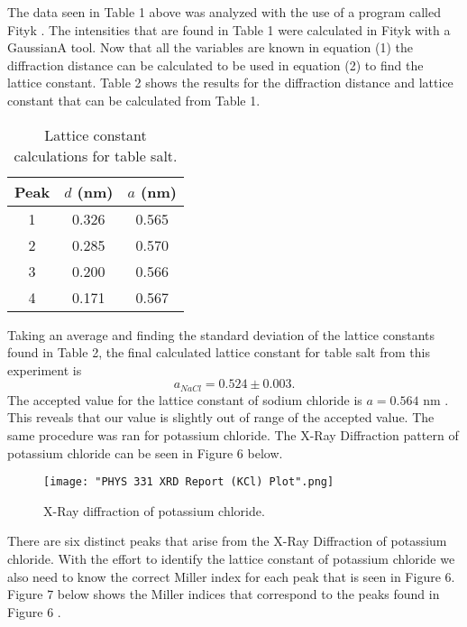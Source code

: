 \documentclass[twocolumn]{article}
\begin{document}
\newline
The data seen in Table 1 above was analyzed with the use of a program called Fityk \cite{Fityk}. The intensities that are found in Table 1 were calculated in Fityk with a GaussianA tool. Now that all the variables are known in equation (1) the diffraction distance can be calculated to be used in equation (2) to find the lattice constant. Table 2 shows the results for the diffraction distance and lattice constant that can be calculated from Table 1.
\begin{table}[htp]
\begin{center}
\begin{tabular}{|c|c|c|}
	\hline \small\textbf{{Peak}} &\small{\textbf{$d$ (nm)}} & \small{\textbf{$a$ (nm)}} \\ \hline
	1 & 0.326 & 0.565 \\ \hline
	2 & 0.285 & 0.570 \\ \hline
	3 & 0.200 & 0.566 \\ \hline
	4 & 0.171 & 0.567 \\ \hline
\end{tabular}
\caption{Lattice constant calculations for table salt.}
\end{center}
\label{default}
\end{table}%
\newline
Taking an average and finding the standard deviation of the lattice constants found in Table 2, the final calculated lattice constant for table salt from this experiment is
\begin{equation}
a_{NaCl}=0.524\pm0.003.
\end{equation}
The accepted value for the lattice constant of sodium chloride is $a=0.564$ nm \cite{WikiLattice}. This reveals that our value is slightly out of range of the accepted value. The same procedure was ran for potassium chloride. The X-Ray Diffraction pattern of potassium chloride can be seen in Figure 6 below.
\begin{figure}[htbp]
\begin{center}
\texttt{[image: "PHYS 331 XRD Report (KCl) Plot".png]}
\caption{X-Ray diffraction of potassium chloride.}
\label{default}
\end{center}
\end{figure}
\newline
There are six distinct peaks that arise from the X-Ray Diffraction of potassium chloride. With the effort to identify the lattice constant of potassium chloride we also need to know the correct Miller index for each peak that is seen in Figure 6. Figure 7 below shows the Miller indices that correspond to the peaks found in Figure 6 \cite{Lin}.
\end{document}
